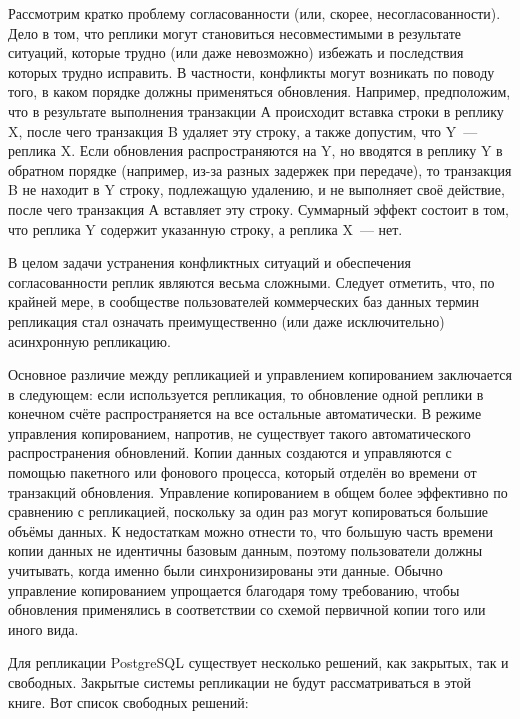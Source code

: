 Рассмотрим кратко проблему согласованности (или, скорее, несогласованности). Дело в том, что реплики могут становиться несовместимыми в результате ситуаций, которые трудно (или даже невозможно) избежать и последствия которых трудно исправить. В частности, конфликты могут возникать по поводу того, в каком порядке должны применяться обновления. Например, предположим, что в результате выполнения транзакции А происходит вставка строки в реплику X, после чего транзакция B удаляет эту строку, а также допустим, что Y~--- реплика X. Если обновления распространяются на Y, но вводятся в реплику Y в обратном порядке (например, из-за разных задержек при передаче), то транзакция B не находит в Y строку, подлежащую удалению, и не выполняет своё действие, после чего транзакция А вставляет эту строку. Суммарный эффект состоит в том, что реплика Y содержит указанную строку, а реплика X~--- нет.

В целом задачи устранения конфликтных ситуаций и обеспечения согласованности реплик являются весьма сложными. Следует отметить, что, по крайней мере, в сообществе пользователей коммерческих баз данных термин репликация стал означать преимущественно (или даже исключительно) асинхронную репликацию.

Основное различие между репликацией и управлением копированием заключается в следующем: если используется репликация, то обновление одной реплики в конечном счёте распространяется на все остальные автоматически. В режиме управления копированием, напротив, не существует такого автоматического распространения обновлений. Копии данных создаются и управляются с помощью пакетного или фонового процесса, который отделён во времени от транзакций обновления. Управление копированием в общем более эффективно по сравнению с репликацией, поскольку за один раз могут копироваться большие объёмы данных. К недостаткам можно отнести то, что большую часть времени копии данных не идентичны базовым данным, поэтому пользователи должны учитывать, когда именно были синхронизированы эти данные. Обычно управление копированием упрощается благодаря тому требованию, чтобы обновления применялись в соответствии со схемой первичной копии того или иного вида.

Для репликации PostgreSQL существует несколько решений, как закрытых, так и свободных. Закрытые системы репликации не будут рассматриваться в этой книге. Вот список свободных решений:

